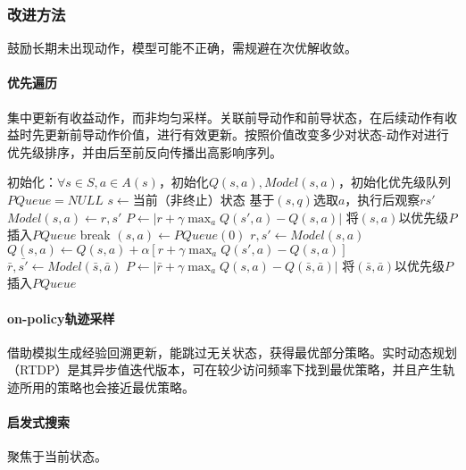 \documentclass[
12pt, %
a4paper, 
oneside, %
headinclude,footinclude, %
]{scrartcl}
\begin{document}
\subsubsection[改进方法]{改进方法}
鼓励长期未出现动作，模型可能不正确，需规避在次优解收敛。
\paragraph{优先遍历}
集中更新有收益动作，而非均匀采样。关联前导动作和前导状态，在后续动作有收益时先更新前导动作价值，进行有效更新。按照价值改变多少对状态-动作对进行优先级排序，并由后至前反向传播出高影响序列。
\begin{myalgorithm}[确定性环境下的优先遍历]
\State 初始化：$ \forall s \in S, a \in A(s) $，初始化$ Q(s, a), Model(s, a) $，初始化优先级队列$ PQueue = NULL $
\Loop
\State $ s \gets $当前（非终止）状态
\State 基于$ (s, q) $选取$ a $，执行后观察$ r s' $ 
\State $ Model(s, a) \gets r, s'$
\State $ P \gets |r + \gamma \max_a Q(s', a) - Q(s, a)| $ 
\State 将$ (s, a) $以优先级$ P $插入$ PQueue $
\EndIf
{}
\State break
\EndIf
\State $ (s, a) \gets PQueue(0) $ 
\State $ r, s' \gets Model(s, a) $ 
\State $ Q(s, a) \gets Q(s, a) + \alpha[r + \gamma \max_a Q(s', a) - Q(s, a)] $ 
 
\State $ \bar{r}, \bar{s'} \gets Model(\bar{s}, \bar{a}) $
\State $ P \gets |\bar{r} + \gamma \max_a Q(s, a) - Q(\bar{s}, \bar{a})| $
\State 将$ (\bar{s}, \bar{a}) $以优先级$ P $插入$ PQueue $
\EndIf
\EndIf
\EndFor
\EndFor
\EndLoop
\end{myalgorithm}
\paragraph{on-policy轨迹采样}
借助模拟生成经验回溯更新，能跳过无关状态，获得最优部分策略。实时动态规划（RTDP）是其异步值迭代版本，可在较少访问频率下找到最优策略，并且产生轨迹所用的策略也会接近最优策略。
\paragraph{启发式搜索}
聚焦于当前状态。
\end{document}
